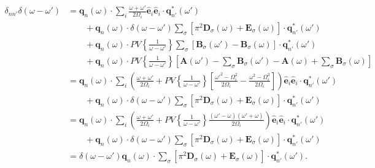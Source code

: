 \begin{equation}
\begin{split}
\delta_{nn'}\delta(\omega - \omega') &= \mathbf{q}_n(\omega)\cdot\sum_{i}\frac{\omega + \omega'}{2\Omega_i}\hat{\mathbf{e}}_i\hat{\mathbf{e}}_i\cdot\mathbf{q}_{n'}^*(\omega')\\
&\qquad + \mathbf{q}_n(\omega)\cdot\delta(\omega - \omega')\sum_\sigma\left[\pi^2\mathbf{D}_\sigma(\omega) + \mathbf{E}_\sigma(\omega)\right]\cdot\mathbf{q}_{n'}^*(\omega')\\
&\qquad + \mathbf{q}_n(\omega)\cdot PV\left\{\frac{1}{\omega - \omega'}\right\}\sum_\sigma\left[\mathbf{B}_\sigma(\omega') - \mathbf{B}_\sigma(\omega)\right]\cdot\mathbf{q}_{n'}^*(\omega')\\
&\qquad + \mathbf{q}_n(\omega)\cdot PV\left\{\frac{1}{\omega - \omega'}\right\}\left[\mathbf{A}(\omega') - \sum_\sigma\mathbf{B}_\sigma(\omega') - \mathbf{A}(\omega) + \sum_\sigma\mathbf{B}_\sigma(\omega)\right]\\
&= \mathbf{q}_n(\omega)\cdot\sum_i\left(\frac{\omega + \omega'}{2\Omega_i} + PV\left\{\frac{1}{\omega - \omega'}\right\}\left[\frac{\omega'^2 - \Omega_i^2}{2\Omega_i} - \frac{\omega^2 - \Omega_i^2}{2\Omega_i}\right]\right)\hat{\mathbf{e}}_i\hat{\mathbf{e}}_i\cdot\mathbf{q}_{n'}^*(\omega')\\
&\qquad + \mathbf{q}_n(\omega)\cdot\delta(\omega - \omega')\sum_\sigma\left[\pi^2\mathbf{D}_\sigma(\omega) + \mathbf{E}_\sigma(\omega)\right]\cdot\mathbf{q}_{n'}^*(\omega')\\
&= \mathbf{q}_n(\omega)\cdot\sum_i\left(\frac{\omega + \omega'}{2\Omega_i} + PV\left\{\frac{1}{\omega - \omega'}\right\}\frac{(\omega' - \omega)(\omega' + \omega)}{2\Omega_i}\right)\hat{\mathbf{e}}_i\hat{\mathbf{e}}_i\cdot\mathbf{q}_{n'}^*(\omega')\\
&\qquad + \mathbf{q}_n(\omega)\cdot\delta(\omega - \omega')\sum_\sigma\left[\pi^2\mathbf{D}_\sigma(\omega) + \mathbf{E}_\sigma(\omega)\right]\cdot\mathbf{q}_{n'}^*(\omega')\\
&= \delta(\omega - \omega')\mathbf{q}_n(\omega)\cdot\sum_\sigma\left[\pi^2\mathbf{D}_\sigma(\omega) + \mathbf{E}_\sigma(\omega)\right]\cdot\mathbf{q}_{n'}^*(\omega').
\end{split}
\end{equation}

